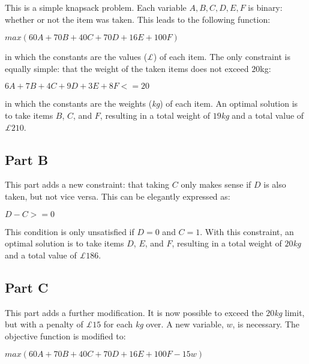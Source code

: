 \documentclass[11pt]{article} %
\begin{document}
This is a simple knapsack problem. Each variable $A, B, C, D, E, F$ is binary: whether or not the item was taken. This leads to the following function:

\begin{center}

$max (60A + 70B + 40C + 70D + 16E + 100F)$

\end{center}

in which the constants are the values (\textit{£}) of each item. The only constraint is equally simple: that the weight of the taken items does not exceed $20$kg:

\begin{center}

$6A + 7B + 4C + 9D + 3E + 8F <= 20$

\end{center}

in which the constants are the weights (\textit{kg}) of each item. An optimal solution is to take items $B$, $C$, and $F$, resulting in a total weight of $19$\textit{kg} and a total value of \textit{£}$210$.

\subsection*{Part B}

This part adds a new constraint:  that taking $C$ only makes sense if $D$ is also taken, but not vice versa. This can be elegantly expressed as:

\begin{center}

$D - C >= 0$

\end{center}

This condition is only unsatisfied if $D = 0$ and $C = 1$. With this constraint, an optimal solution is to take items $D$, $E$, and $F$, resulting in a total weight of $20$\textit{kg} and a total value of \textit{£}$186$.

\subsection*{Part C}

This part adds a further modification. It is now possible to exceed the $20$\textit{kg} limit, but with a penalty of \textit{£}$15$ for each \textit{kg} over. A new variable, $w$, is necessary. The objective function is modified to:

\begin{center}

$max (60A + 70B + 40C + 70D + 16E + 100F - 15w)$

\end{center}
\end{document}
